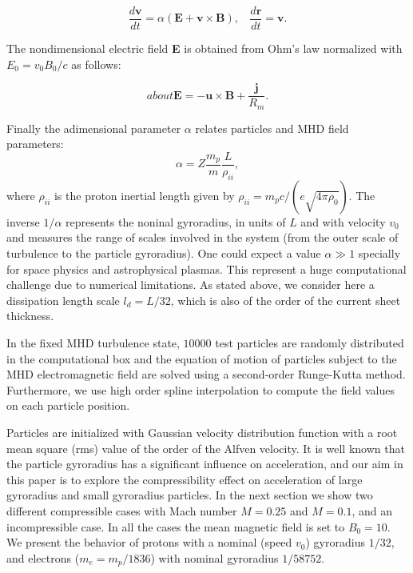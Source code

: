 \documentclass[%
aip,pop,amsmath,amssymb,
 reprint,%
]{revtex4-1}
\begin{document}
\begin{equation}
  \frac{d\textbf{v}}{dt} = \alpha(\textbf{E} + \textbf{v} \times \textbf{B}), \ \ \ \  \frac{d\textbf{r}}{dt} = \textbf{v}.
\end{equation}
 
The nondimensional electric field \textbf{E} is obtained from Ohm's law 
normalized with $E_0= v_0 B_0/c$ as follows:

\begin{equation} about 
 \textbf{E} =  -\textbf{u}  \times \textbf{B} + \frac{\textbf{j}}{R_m}. 
\end{equation}

Finally the adimensional parameter $\alpha$ relates particles and MHD field parameters:
\begin{equation}
\alpha=Z\frac{m_p}{m}\frac{L}{\rho_{ii}},
\end{equation}
where $\rho_{ii}$ is the proton inertial length given 
by $\rho_{ii}=m_pc/(e\sqrt{4\pi\rho_0})$. The inverse $1/\alpha$ represents the noninal 
gyroradius, in units of $L$ and with velocity $v_0$ and measures the range of 
scales involved in the system (from the outer scale of turbulence to the particle
gyroradius). One could expect a value
$\alpha \gg 1$ specially for space physics and astrophysical plasmas.
This represent a huge computational challenge due to 
numerical limitations. As stated above, we consider here a dissipation length scale
$l_d=L/32$, which is also of the order of the current sheet thickness.



In the fixed MHD turbulence state, $10000$ test particles are 
randomly distributed 
in the computational box and the equation of motion of particles 
subject to the MHD
electromagnetic field are solved using a second-order Runge-Kutta method. 
Furthermore, we use high order spline interpolation to compute the field values on each
particle position.


Particles are initialized with Gaussian velocity distribution function with a 
root mean square (rms) value of the order of the Alfven velocity. It is well known that the 
particle gyroradius has a significant influence 
on acceleration, and our aim in this paper is to explore the compressibility effect on 
acceleration of large gyroradius 
and small gyroradius particles. 
In the next section we show two different compressible cases 
with Mach number $M=0.25$ and $M=0.1$, and an incompressible case. In all the cases the 
mean magnetic field is set to $B_0=10$. We present the behavior of protons with a 
nominal (speed $v_0$) gyroradius $1/32$, and electrons  ($m_e=m_p/1836$)
with nominal gyroradius $1/58752$.
\end{document}
